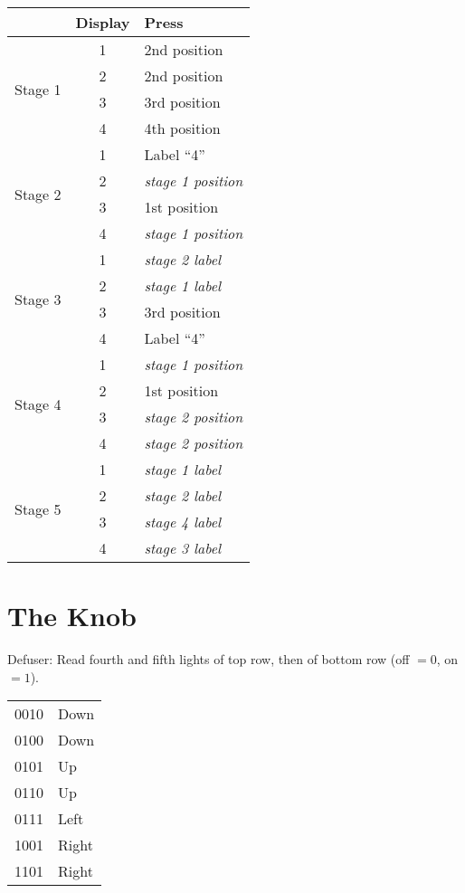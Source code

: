\documentclass[11pt]{amsart}
\begin{document}
\begin{tabular}{|l|c|l|}
\hline
 & Display & Press \\
\hline
\multirow{4}{*}{Stage 1} & 1 & 2nd position \\
                         & 2 & 2nd position \\
                         & 3 & 3rd position \\
                         & 4 & 4th position \\
\hline
\multirow{4}{*}{Stage 2} & 1 & Label ``4'' \\
                         & 2 & \textit{stage 1 position} \\
                         & 3 & 1st position \\
                         & 4 & \textit{stage 1 position} \\
\hline
\multirow{4}{*}{Stage 3} & 1 & \textit{stage 2 label} \\
                         & 2 & \textit{stage 1 label} \\
                         & 3 & 3rd position \\
                         & 4 & Label ``4'' \\
\hline
\multirow{4}{*}{Stage 4} & 1 & \textit{stage 1 position} \\
                         & 2 & 1st position \\
                         & 3 & \textit{stage 2 position} \\
                         & 4 & \textit{stage 2 position} \\
\hline
\multirow{4}{*}{Stage 5} & 1 & \textit{stage 1 label} \\
                         & 2 & \textit{stage 2 label} \\
                         & 3 & \textit{stage 4 label} \\
                         & 4 & \textit{stage 3 label} \\
\hline
\end{tabular}




\section{The Knob}

Defuser: Read fourth and fifth lights of top row, then of bottom row (off $=
0$, on $= 1$).

\begin{tabular}{|l|l|}
\hline
0010 & Down \\
0100 & Down \\
0101 & Up \\
0110 & Up \\
0111 & Left \\
1001 & Right \\
1101 & Right \\
\hline
\end{tabular}
\end{document}
